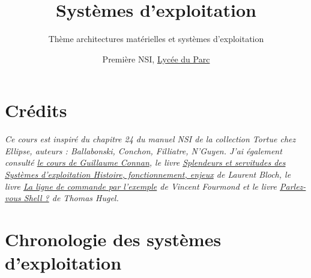 \documentclass[
  11pt,
]{article}
\title{Systèmes d'exploitation}
\subtitle{Thème architectures matérielles et systèmes d'exploitation}
\author{Première NSI, \href{https://frederic-junier.org/}{Lycée du
Parc}}
\date{}
\newcounter{cours}
\newcounter{logi}
\begin{document}
\maketitle

\renewcommand*\contentsname{Table des matières}
{
\hypersetup{linkcolor=}
\setcounter{tocdepth}{3}
\tableofcontents
}
\hypertarget{cruxe9dits}{%
\section*{Crédits}\label{cruxe9dits}}

\emph{Ce cours est inspiré du chapitre 24 du manuel NSI de la collection
Tortue chez Ellipse, auteurs : Ballabonski, Conchon, Filliatre, N'Guyen.
J'ai également consulté
\href{https://gitlab.com/lyceeND/1ere/-/blob/master/2019_20/2_Systeme_1/systeme19.md}{le
cours de Guillaume Connan}, le livre
\href{https://laurentbloch.net/MySpip3/IMG/pdf/histsys-screen-20200727.pdf}{Splendeurs
et servitudes des Systèmes d'exploitation Histoire, fonctionnement,
enjeux} de Laurent Bloch, le livre
\href{https://www.eyrolles.com/Informatique/Livre/la-ligne-de-commande-par-l-exemple-9782351410721/}{La
ligne de commande par l'exemple} de Vincent Fourmond et le livre
\href{https://www.eyrolles.com/Informatique/Livre/parlez-vous-shell--9782729877590/}{Parlez-vous
Shell ?} de Thomas Hugel.}

\hypertarget{chronologie-des-systuxe8mes-dexploitation}{%
\section{Chronologie des systèmes
d'exploitation}\label{chronologie-des-systuxe8mes-dexploitation}}
\end{document}
